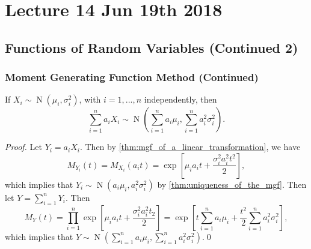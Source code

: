 \documentclass[notoc,notitlepage]{tufte-book}
\DeclareMathOperator{\Nor}{N }
\begin{document}



\chapter{Lecture 14 Jun 19th 2018}%
\label{chp:lecture_14_jun_19th_2018}

\section{Functions of Random Variables (Continued 2)}%
\label{sec:functions_of_random_variables_continued_2}

\subsection{Moment Generating Function Method (Continued)}%
\label{sub:moment_generating_function_method_continued}

\begin{thm}
\label{thm:gaussian_distribution}
If $X_i \sim \Nor( \mu_i, \sigma_i^2 )$, with $i = 1, ..., n$ independently, then
\begin{equation*}
  \sum_{i=1}^{n} a_i X_i \sim \Nor\left( \sum_{i=1}^{n} a_i \mu_i, \sum_{i=1}^{n} a_i^2 \sigma_i^2 \right).
\end{equation*}
\end{thm}

\begin{proof}
  Let $Y_i = a_i X_i$. Then by \cref{thm:mgf_of_a_linear_transformation}, we have
  \begin{equation*}
    M_{Y_i}(t) = M_{X_i}(a_i t) = \exp\left[ \mu_i a_i t + \frac{\sigma_i^2 a_i^2 t^2}{2} \right],
  \end{equation*}
  which implies that $Y_i \sim \Nor( a_i \mu_i, a_i^2 \sigma_i^2 )$ by \cref{thm:uniqueness_of_the_mgf}. Then let $Y = \sum_{i=1}^{n} Y_i$. Then
  \begin{equation*}
    M_Y(t) = \prod_{i=1}^{n} \exp\left[ \mu_i a_i t + \frac{\sigma_i^2 a_i^2 t_2}{2} \right] = \exp\left[ t \sum_{i=1}^{n} a_i \mu_i + \frac{t^2}{2} \sum_{i=1}^{n} a_i^2 \sigma_i^2 \right],
  \end{equation*}
  which implies that $Y \sim \Nor\left( \sum_{i=1}^{n} a_i \mu_i , \sum_{i=1}^{n} a_i^2 \sigma_i^2 \right)$.\qed
\end{proof}
\end{document}

